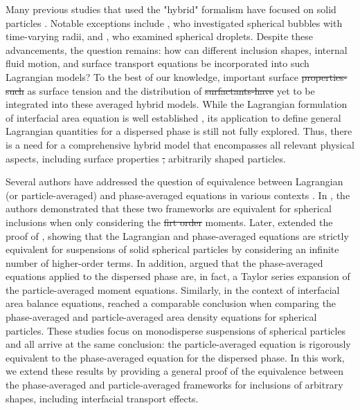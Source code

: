 \documentclass[11pt]{My_preprint}
\providecommand{\DIFadd}[1]{{\protect\color{blue}\uwave{#1}}} %
\providecommand{\DIFdel}[1]{{\protect\color{red}\sout{#1}}}                      %
\providecommand{\DIFaddbegin}{} %
\providecommand{\DIFaddend}{} %
\providecommand{\DIFdelbegin}{} %
\providecommand{\DIFdelend}{} %
\begin{document}
Many previous studies that used the "hybrid" formalism have focused on solid particles \citep{buyevich1979flow,jackson1997locally}. 
Notable exceptions include \citet{zhang1994ensemble}, who investigated spherical bubbles with time-varying radii, and \citet{zhang1997momentum}, who examined spherical droplets. 
Despite these advancements, the question remains: how can different inclusion shapes, internal fluid motion, and surface transport equations be incorporated into such Lagrangian models? 
To the best of our knowledge, important surface \DIFdelbegin \DIFdel{properties-such }\DIFdelend \DIFaddbegin \DIFadd{properties such }\DIFaddend as surface tension and the distribution of \DIFdelbegin \DIFdel{surfactants-have }\DIFdelend \DIFaddbegin \DIFadd{surfactants have }\DIFaddend yet to be integrated into these averaged hybrid models. 
While the Lagrangian formulation of \DIFaddbegin \DIFadd{the }\DIFaddend interfacial area equation is well established \citep{lhuillier2000bilan}, its application to define general Lagrangian quantities for a dispersed phase is still not fully explored. 
Thus, there is a need for a comprehensive hybrid model that encompasses all relevant physical aspects, including surface properties \DIFdelbegin \DIFdel{, }\DIFdelend \DIFaddbegin \DIFadd{and }\DIFaddend arbitrarily shaped particles.










Several authors have addressed the question of equivalence between Lagrangian (or particle-averaged) and phase-averaged equations in various contexts \citep{zhang1997momentum,lhuillier2000bilan,nott2011suspension}. 
In \citet[Appendix A]{zhang1997momentum}, the authors demonstrated that these two frameworks are equivalent for spherical inclusions when only considering the \DIFdelbegin \DIFdel{firt order }\DIFdelend \DIFaddbegin \DIFadd{first-order }\DIFaddend moments. 
Later, \citet[Appendix A]{nott2011suspension} extended the proof of \citet{zhang1997momentum}, showing that the Lagrangian and phase-averaged equations are strictly equivalent for suspensions of solid spherical particles by considering an infinite number of higher-order terms. 
In addition, \citet{lhuillier2010multiphase} argued that the phase-averaged equations applied to the dispersed phase are, in fact, a Taylor series expansion of the particle-averaged moment equations.
Similarly, in the context of interfacial area balance equations, \citet{lhuillier2000bilan} reached a comparable conclusion when comparing the phase-averaged and particle-averaged area density equations for spherical particles. 
These studies focus on monodisperse suspensions of spherical particles and all arrive at the same conclusion: the particle-averaged equation is rigorously equivalent to the phase-averaged equation for the dispersed phase.
In this work, we extend these results by providing a general proof of the equivalence between the phase-averaged and particle-averaged frameworks for inclusions of arbitrary shapes, including interfacial transport effects.
\end{document}
